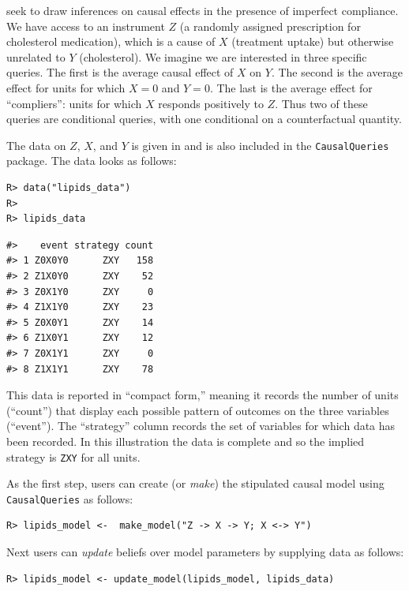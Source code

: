 \documentclass[
  11pt,
  article]{jss}
\begin{document}
\citet{chickering_clinicians_1996} seek to draw inferences on causal
effects in the presence of imperfect compliance. We have access to an
instrument \(Z\) (a randomly assigned prescription for cholesterol
medication), which is a cause of \(X\) (treatment uptake) but otherwise
unrelated to \(Y\) (cholesterol). We imagine we are interested in three
specific queries. The first is the average causal effect of \(X\) on
\(Y\). The second is the average effect for units for which \(X=0\) and
\(Y=0\). The last is the average effect for ``compliers'': units for
which \(X\) responds positively to \(Z\). Thus two of these queries are
conditional queries, with one conditional on a counterfactual quantity.

The data on \(Z\), \(X\), and \(Y\) is given in
\citet{chickering_clinicians_1996} and is also included in the
\texttt{CausalQueries} package. The data looks as follows:

\begin{verbatim}
R> data("lipids_data")
R> 
R> lipids_data
\end{verbatim}

\begin{verbatim}
#>    event strategy count
#> 1 Z0X0Y0      ZXY   158
#> 2 Z1X0Y0      ZXY    52
#> 3 Z0X1Y0      ZXY     0
#> 4 Z1X1Y0      ZXY    23
#> 5 Z0X0Y1      ZXY    14
#> 6 Z1X0Y1      ZXY    12
#> 7 Z0X1Y1      ZXY     0
#> 8 Z1X1Y1      ZXY    78
\end{verbatim}

This data is reported in ``compact form,'' meaning it records the number
of units (``count'') that display each possible pattern of outcomes on
the three variables (``event''). The ``strategy'' column records the set
of variables for which data has been recorded. In this illustration the
data is complete and so the implied strategy is \texttt{ZXY} for all
units.

As the first step, users can create (or \emph{make}) the stipulated
causal model using \texttt{CausalQueries} as follows:

\begin{verbatim}
R> lipids_model <-  make_model("Z -> X -> Y; X <-> Y") 
\end{verbatim}

Next users can \emph{update} beliefs over model parameters by supplying
data as follows:

\begin{verbatim}
R> lipids_model <- update_model(lipids_model, lipids_data)
\end{verbatim}
\end{document}
